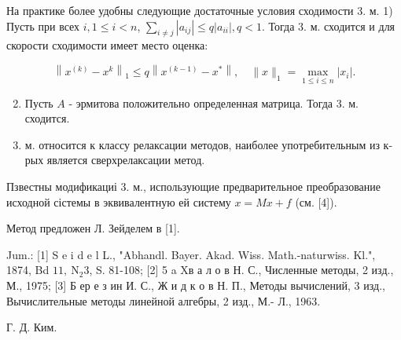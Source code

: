 \documentclass[10pt]{article}
\begin{document}
На практике более удобны следующие достаточные условия сходимости 3. м. 1) Пусть при всех $i, 1 \leqslant i<n$, $\sum_{i \neq j}\left|a_{i j}\right| \leqslant q\left|a_{i i}\right|, q<1$. Тогда 3. м. сходится и для скорости сходимости имеет место оценка:



\[

\left\|x^{(k)}-x^{k}\right\|_{1} \leqslant q\left\|x^{(k-1)}-x^{*}\right\|, \quad\|x\|_{1}=\max _{1 \leqslant i \leqslant n}\left|x_{i}\right| .

\]



\begin{enumerate}

  \setcounter{enumi}{1}

  \item Пусть $A$ - эрмитова положительно определенная матрица. Тогда 3. м. сходится.

\end{enumerate}



\begin{enumerate}

  \setcounter{enumi}{2}

  \item м. относится к классу релаксации методов, наиболее употребительным из к-рых является сверхрелаксации метод.

\end{enumerate}



Пзвестны модификациі 3. м., использующие предварительное преобразование исходной сістемы в эквивалентную ей систему $x=M x+f$ (см. [4]).



Метод предложен Л. Зейделем в [1].



Jum.: [1] S e i d e l L., "Abhandl. Bayer. Akad. Wiss. Math.-naturwiss. Kl.", 1874, Bd $11, \mathrm{~N}_{2} 3$, S. 81-108; [2] 5 a Xв а л о в Н. С., Численные методы, 2 изд., М., 1975; [3] Б ер е з ин И. С., Ж и д к о в Н. П., Методы вычислений, 3 изд., Вычислительные методы линейной алгебры, 2 изд., М.- Л., 1963.



Г. Д. Ким.
\end{document}
